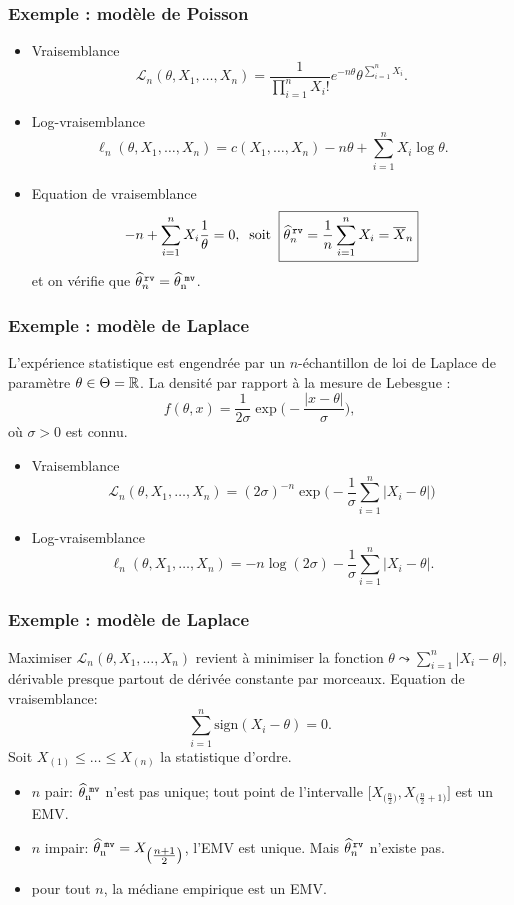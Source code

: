 \begin{frame}
\frametitle{Exemple : modèle de Poisson}
\begin{itemize}
\item
\alert{Vraisemblance}
$${\mathcal L}_n(\theta, X_1,\ldots, X_n) =
\frac{1}{\prod_{i = 1}^n X_i!}e^{-n\theta}\theta^{\sum_{i = 1}^n X_i}.$$
\item \alert{Log-vraisemblance}
$$\ell_n(\theta, X_1,\ldots, X_n) = c(X_1,\ldots, X_n)-n\theta +\sum_{i =1}^n X_i \log \theta.$$
\item \alert{Equation de vraisemblance}
$$-n+\sum_{i = 1}^n X_i \frac{1}{\theta} = 0,\;\;
\text{soit}\;\;
\boxed{\widehat \theta_n^{\,{\tt rv}} = \frac{1}{n}\sum_{i = 1}^n X_i=\overline{X}_n}$$
et on vérifie que $\widehat \theta_n^{\,{\tt rv}} =\operatorname{\widehat \theta_n^{\,\,{\tt mv}}}$.
\end{itemize}
\end{frame}

\begin{frame}
\frametitle{Exemple : mod\`ele de Laplace} L'expérience statistique
est engendrée par un $n$-échantillon de loi de Laplace de paramètre
$\theta \in \Theta = \operatorname{{\mathbb R}}$. La densité par rapport à la mesure de
Lebesgue :
$$f(\theta,x) = \frac{1}{2\sigma}\exp\big(-\frac{|x-\theta|}{\sigma}\big),$$
où $\sigma >0$ est \alert{connu}.
\begin{itemize}
\item \alert{Vraisemblance}
$${\mathcal L}_n(\theta, X_1,\ldots, X_n) = (2\sigma)^{-n}
\exp\big(-\frac{1}{\sigma}\sum_{i = 1}^n \big|X_i-\theta\big|\big)$$
\item \alert{Log-vraisemblance}
$$\ell_n(\theta,X_1,\ldots, X_n) = - n \log(2\sigma)-
\frac{1}{\sigma}\sum_{i = 1}^n \big|X_i-\theta\big|.$$
\end{itemize}
\end{frame}

\begin{frame}
\frametitle{Exemple : mod\`ele de Laplace} Maximiser ${\mathcal
L}_n(\theta, X_1,\ldots, X_n)$ revient à minimiser la fonction
$\theta \leadsto \sum_{i = 1}^n \big|X_i-\theta\big|$,
dérivable presque partout de dérivée constante par morceaux.
\alert{Equation de vraisemblance:}
$$\sum_{i = 1}^n \text{sign}(X_i-\theta)=0.$$
Soit $X_{(1)}\leq \ldots \leq X_{(n)}$ la statistique d'ordre.
\begin{itemize}
\item
$n$ pair: $\operatorname{\widehat \theta_n^{\,\,{\tt mv}}}$ \alert{n'est pas unique}; tout point de
l'intervalle
$\big[X_{\big(\tfrac{n}{2}\big)},X_{\big(\tfrac{n}{2}+1\big)} \big]$
est un EMV.
\item $n$ impair: $\operatorname{\widehat \theta_n^{\,\,{\tt mv}}}=X_{\big(\tfrac{n+1}{2}\big)}$,
l'EMV est unique. Mais $\widehat \theta_n^{\,{\tt rv}}$ n'existe
pas.
\item \alert{pour tout} $n$, la
médiane empirique est un EMV.
\end{itemize}
\end{frame}

